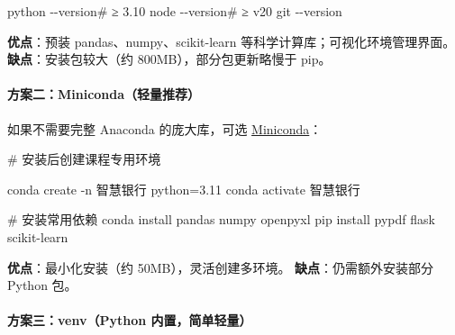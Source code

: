 \documentclass[
  american,
  chinese,
]{ctexart}
\begin{document}
\foreignlanguage{american}{python
-\/-version\# ≥ 3.10 node -\/-version\# ≥ v20 git -\/-version}

{\textbf{\foreignlanguage{american}{优点}}\foreignlanguage{american}{：预装}}\foreignlanguage{american}{ {pandas{、}numpy{、}scikit-learn}
}{\foreignlanguage{american}{等科学计算库；可视化环境管理界面}}\foreignlanguage{american}{。}\foreignlanguage{american}{\hfill\break
}{\textbf{\foreignlanguage{american}{缺点}}\foreignlanguage{american}{：安装包较大（约}}\foreignlanguage{american}{ 800MB}\foreignlanguage{american}{），{部分包更新略慢于}}\foreignlanguage{american}{ pip}\foreignlanguage{american}{。}

\paragraph{\texorpdfstring{{\foreignlanguage{american}{方案二：}\foreignlanguage{american}{Miniconda}\foreignlanguage{american}{（轻量推荐}}\foreignlanguage{american}{）}}{方案二：Miniconda（轻量推荐）}}\label{ux65b9ux6848ux4e8cminicondaux8f7bux91cfux63a8ux8350}

{\foreignlanguage{american}{如果不需要完整}}\foreignlanguage{american}{ Anaconda }{\foreignlanguage{american}{的庞大库，可选}}\foreignlanguage{american}{ \href{https://docs.conda.io/en/latest/miniconda.html}{Miniconda}}\foreignlanguage{american}{：}

\foreignlanguage{american}{\# }{\foreignlanguage{american}{安装后创建课程专用环境}}\foreignlanguage{american}{ }

{\foreignlanguage{american}{conda}}\foreignlanguage{american}{ create -n }{\foreignlanguage{american}{智慧银行}}\foreignlanguage{american}{ python=3.11 {conda}
activate }{\foreignlanguage{american}{智慧银行}}\foreignlanguage{american}{{~ }}

\foreignlanguage{american}{\# }{\foreignlanguage{american}{安装常用依赖}}\foreignlanguage{american}{ {conda} install
pandas {numpy} {openpyxl} pip
install {pypdf} flask scikit-learn}

\textbf{{优点}}{：最小化安装（约}\foreignlanguage{american}{ 50MB}{），灵活创建多环境。}\foreignlanguage{american}{\hfill\break
}\textbf{{缺点}}{：仍需额外安装部分}\foreignlanguage{american}{ Python }{包。}\foreignlanguage{american}{}

\paragraph{\texorpdfstring{{方案三：}{\foreignlanguage{american}{venv}}{（}\foreignlanguage{american}{Python }{内置，简单轻量）}\foreignlanguage{american}{}}{方案三：venv（Python 内置，简单轻量）}}\label{ux65b9ux6848ux4e09venvpython-ux5185ux7f6eux7b80ux5355ux8f7bux91cf}
\end{document}
